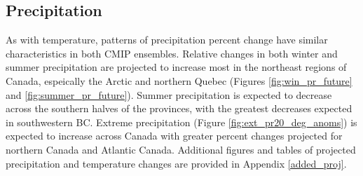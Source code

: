 \documentclass[]{scrartcl}
\begin{document}
\subsection{Precipitation}
As with temperature, patterns of precipitation percent change have similar characteristics in both CMIP ensembles. Relative changes in both winter and summer precipitation are projected to increase most in the northeast regions of Canada, espeically the Arctic and northern Quebec (Figures \ref{fig:win_pr_future} and \ref{fig:summer_pr_future}). Summer precipitation is expected to decrease across the southern halves of the provinces, with the greatest decreases expected in southwestern BC. Extreme precipitation (Figure \ref{fig:ext_pr20_deg_anoms}) is expected to increase across Canada with greater percent changes projected for northern Canada and Atlantic Canada. Additional figures and tables of projected precipitation and temperature changes are provided in Appendix \ref{added_proj}.
\end{document}

